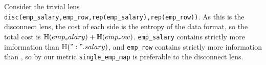 \documentclass[acmsmall,screen,anonymous]{acmart}
\begin{document}
%
%

Consider the trivial lens
\lstinline{disc(emp_salary,emp_row,rep(emp_salary),rep(emp_row))}. As this is
the disconnect lens, the cost of each side is the entropy of the data format, so
the total cost is $\EntropyOf{\lstinline{emp_salary} } +
\EntropyOf{\lstinline{emp_row}}$. \lstinline{emp_salary} contains strictly more
imformation than $\EntropyOf{\lstinline{": " . salary}}$, and
\lstinline{emp_row} contains strictly more information than
, so by our metric
\lstinline{single_emp_map} is preferable to the disconnect lens.
\end{document}
